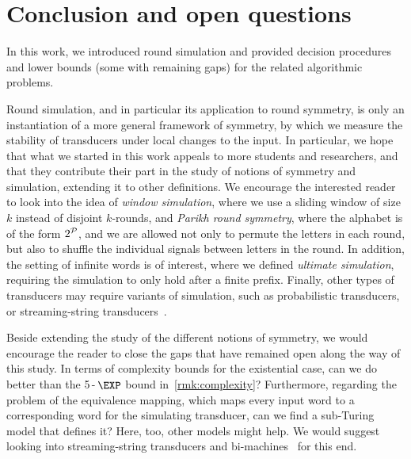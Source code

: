 \chapter{Conclusion and open questions}
\label{chap:conclusion}
\label{chap:discussion}
\label{chap:future}

In this work, we introduced round simulation and provided decision procedures and lower bounds (some with remaining gaps) for the related algorithmic problems.

Round simulation, and in particular its application to round symmetry, is only an instantiation of a more general framework of symmetry, by which we measure the stability of transducers under local changes to the input. In particular, we hope that what we started in this work appeals to more students and researchers, and that they contribute their part in the study of notions of symmetry and simulation, extending it to other definitions. We encourage the interested reader to look into the idea of \emph{window simulation}, where we use a sliding window of size $k$ instead of disjoint $k$-rounds, and \emph{Parikh round symmetry}, where the alphabet is of the form $2^{\mathcal{P}}$, and we are allowed not only to permute the letters in each round, but also to shuffle the individual signals between letters in the round. 
In addition, the setting of infinite words is of interest, where we defined \emph{ultimate simulation}, requiring the simulation to only hold after a finite prefix.
Finally, other types of transducers may require variants of simulation, such as probabilistic transducers, or streaming-string transducers~\cite{Alur2010}.

Beside extending the study of the different notions of symmetry, we would encourage the reader to close the gaps that have remained open along the way of this study. In terms of complexity bounds for the existential case, can we do better than the 5\,-\,$\EXP$ bound in~\autoref{rmk:complexity}?
Furthermore, regarding the problem of the equivalence mapping, which maps every input word to a corresponding word for the simulating transducer, can we find a sub-Turing model that defines it? Here, too, other models might help. We would suggest looking into streaming-string transducers and bi-machines~\cite{Muscholl} for this end.
